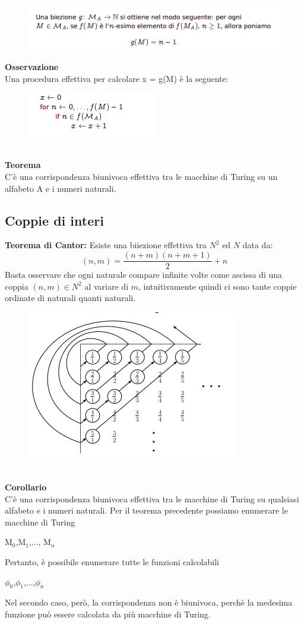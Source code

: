 \begin{figure}[htp]
    \centering
    \includegraphics[scale=0.9]{tesi_stile/img/biiezione.png}
\end{figure}
\textbf{Osservazione}\\
Una procedura effettiva per calcolare x = g(M) è la seguente:
\begin{figure}[htp]
    \centering
    \includegraphics[scale=0.8]{tesi_stile/img/algoritmo.png}
\end{figure}\\
\textbf{Teorema}\\
C’è una corrispondenza biunivoca effettiva tra le macchine di Turing su un alfabeto A e i numeri naturali.
\newpage
\subsection{Coppie di interi}
\textbf{Teorema di Cantor:} Esiste una biiezione effettiva tra $N^2$ ed $N$ data da:\\
$$(n,m)=\frac{(n+m)(n+m+1)}{2}+n$$
Basta osservare che ogni naturale compare infinite volte come ascissa di una coppia $(n,m) \in N^2$ al variare di $m$, intuitivamente quindi ci sono tante coppie ordinate di naturali quanti naturali.
\begin{figure}[htp]
    \centering
    \includegraphics[scale=0.9]{tesi_stile/img/cantor.png}
\end{figure}\\
\textbf{Corollario}\\
C’è una corrispondenza biunivoca effettiva tra le macchine di Turing su qualsiasi alfabeto e i numeri naturali.
Per il teorema precedente possiamo enumerare le macchine di Turing
\begin{center}
    M$_0$,M$_1$,...,    M$_n$
\end{center}
Pertanto, è possibile enumerare tutte le funzioni calcolabili
\begin{center}
    $\phi_0$,$\phi_1$,...,$\phi_n$
\end{center}
Nel secondo caso, però, la corrispondenza non è biunivoca, perchè la medesima funzione può essere calcolata da più macchine di Turing.
